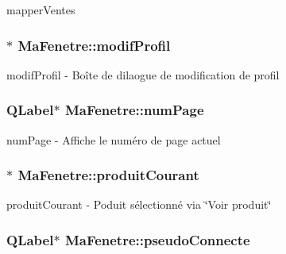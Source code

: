 mapper\-Ventes 

\hypertarget{class_ma_fenetre_accfaae414323cd476f255f51a98414f0}{
\subsubsection[{modif\-Profil}]{$\ast$ Ma\-Fenetre\-::modif\-Profil\hspace{0.3cm}{\ttfamily [protected]}}}\label{class_ma_fenetre_accfaae414323cd476f255f51a98414f0}


modif\-Profil -\/ Boîte de dilaogue de modification de profil 

\hypertarget{class_ma_fenetre_a941eff753d1e20d0ef212aa875570330}{
\subsubsection[{num\-Page}]{\setlength{\rightskip}{0pt plus 5cm}Q\-Label$\ast$ Ma\-Fenetre\-::num\-Page\hspace{0.3cm}{\ttfamily [protected]}}}\label{class_ma_fenetre_a941eff753d1e20d0ef212aa875570330}


num\-Page -\/ Affiche le numéro de page actuel 

\hypertarget{class_ma_fenetre_abc16cc0e7668b65019bffe2d595be2a0}{
\subsubsection[{produit\-Courant}]{$\ast$ Ma\-Fenetre\-::produit\-Courant\hspace{0.3cm}{\ttfamily [protected]}}}\label{class_ma_fenetre_abc16cc0e7668b65019bffe2d595be2a0}


produit\-Courant -\/ Poduit sélectionné via \char`\"{}\-Voir produit\char`\"{} 

\hypertarget{class_ma_fenetre_ae7932944c172401e793af721335e7c3d}{
\subsubsection[{pseudo\-Connecte}]{\setlength{\rightskip}{0pt plus 5cm}Q\-Label$\ast$ Ma\-Fenetre\-::pseudo\-Connecte\hspace{0.3cm}{\ttfamily [protected]}}}\label{class_ma_fenetre_ae7932944c172401e793af721335e7c3d}


